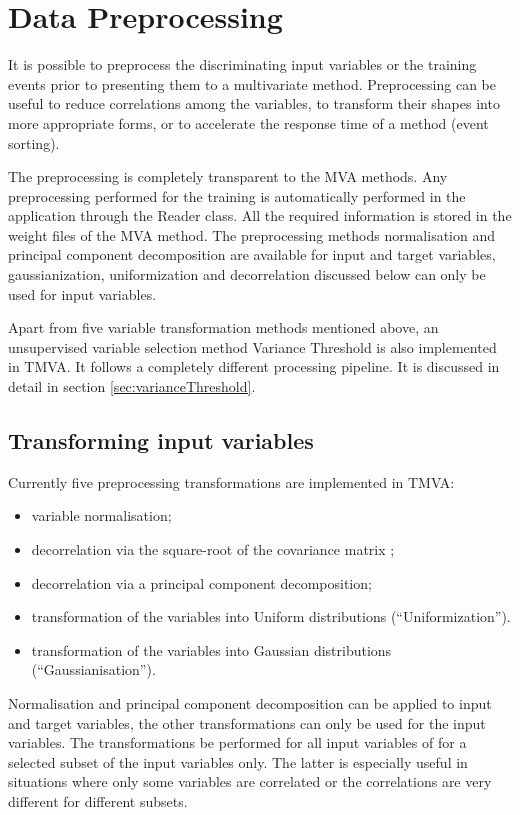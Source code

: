 \section{Data Preprocessing}
\label{sec:dataPreprocessing}

It is possible to preprocess the discriminating input variables or the training events prior 
to presenting them to a multivariate method. Preprocessing can be useful to reduce correlations 
among the variables, to transform their shapes into more appropriate forms, or to accelerate 
the response time of a method (event sorting). 

The preprocessing is completely transparent to 
the MVA methods. Any preprocessing performed for the training is automatically performed in 
the application through the Reader class. All the required information is stored in the 
weight files of the MVA method. The preprocessing methods normalisation and principal component 
decomposition are available for input and target variables, gaussianization, uniformization and decorrelation 
discussed below can only be used for input variables. 

Apart from five variable transformation methods mentioned above, an unsupervised variable selection method Variance Threshold is also implemented in TMVA. It follows a completely different processing pipeline. It is discussed in detail in section \ref{sec:varianceThreshold}. 

\subsection{Transforming input variables}
\label{sec:variableTransform}

Currently five preprocessing  
transformations
are implemented in TMVA:
\begin{itemize}
\item variable normalisation;
\item decorrelation via the square-root of the covariance matrix ;
\item decorrelation via a principal component decomposition;
\item transformation of the variables into Uniform distributions (``Uniformization'').
\item transformation of the variables into Gaussian distributions (``Gaussianisation'').
\end{itemize}
Normalisation and principal component decomposition can be applied to input and target variables, 
the other transformations can only be used for the input variables.  The transformations be performed for all input variables of for a selected subset of the input variables only. The latter is especially useful in situations where only some variables are correlated or the correlations are very different for different subsets.

